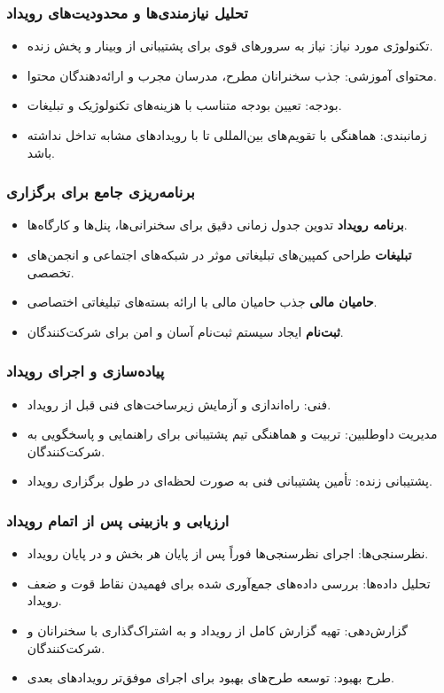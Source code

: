 \subsubsection*{تحلیل نیازمندی‌ها و محدودیت‌های رویداد}
\begin{itemize}
	\item تکنولوژی مورد نیاز: نیاز به سرورهای قوی برای پشتیبانی از وبینار و پخش زنده.
	\item محتوای آموزشی: جذب سخنرانان مطرح، مدرسان مجرب و ارائه‌دهندگان محتوا.
	\item بودجه: تعیین بودجه متناسب با هزینه‌های تکنولوژیک و تبلیغات.
	\item زمانبندی: هماهنگی با تقویم‌های بین‌المللی تا با رویدادهای مشابه تداخل نداشته باشد.
\end{itemize}

\subsubsection*{برنامه‌ریزی جامع برای برگزاری}
\begin{itemize}
\item \textbf{برنامه رویداد} تدوین جدول زمانی دقیق برای سخنرانی‌ها، پنل‌ها و کارگاه‌ها.
\item \textbf{تبلیغات} طراحی کمپین‌های تبلیغاتی موثر در شبکه‌های اجتماعی و انجمن‌های تخصصی.
\item \textbf{حامیان مالی} جذب حامیان مالی با ارائه بسته‌های تبلیغاتی اختصاصی.
\item \textbf{ثبت‌نام} ایجاد سیستم ثبت‌نام آسان و امن برای شرکت‌کنندگان.
\end{itemize}

\subsubsection*{پیاده‌سازی و اجرای رویداد}
\begin{itemize}
	\item فنی: راه‌اندازی و آزمایش زیرساخت‌های فنی قبل از رویداد.
	\item مدیریت داوطلبین: تربیت و هماهنگی تیم پشتیبانی برای راهنمایی و پاسخگویی به شرکت‌کنندگان.
	\item پشتیبانی زنده: تأمین پشتیبانی فنی به صورت لحظه‌ای در طول برگزاری رویداد.
\end{itemize}

\subsubsection*{ارزیابی و بازبینی پس از اتمام رویداد}
\begin{itemize}
	\item نظرسنجی‌ها: اجرای نظرسنجی‌ها فوراً پس از پایان هر بخش و در پایان رویداد.
	\item تحلیل داده‌ها: بررسی داده‌های جمع‌آوری شده برای فهمیدن نقاط قوت و ضعف رویداد.
	\item گزارش‌دهی: تهیه گزارش کامل از رویداد و به اشتراک‌گذاری با سخنرانان و شرکت‌کنندگان.
	\item طرح بهبود: توسعه طرح‌های بهبود برای اجرای موفق‌تر رویدادهای بعدی.
\end{itemize}

